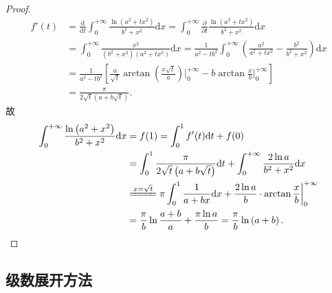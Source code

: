 \documentclass[../../main.tex]{subfiles}%
\begin{document}
\begin{proof}
\begin{align*}
f'(t)&=\frac{\mathrm{d}}{\mathrm{d}t}\int_0^{+\infty}\frac{\ln \left( a^2+tx^2 \right)}{b^2+x^2}\mathrm{d}x=\int_0^{+\infty}\frac{\partial}{\partial t}\frac{\ln \left( a^2+tx^2 \right)}{b^2+x^2}\mathrm{d}x\\
&=\int_0^{+\infty}\frac{x^2}{\left( b^2+x^2 \right) \left( a^2+tx^2 \right)}\mathrm{d}x
=\frac{1}{a^2-tb^2}\int_0^{+\infty}\left( \frac{a^2}{a^2+tx^2}-\frac{b^2}{b^2+x^2} \right) \mathrm{d}x\\
&=\frac{1}{a^2-tb^2}\left[ \frac{a}{\sqrt{t}}\arctan \left( \frac{x\sqrt{t}}{a} \right) \bigg|_{0}^{+\infty}-b\arctan \frac{x}{b}\bigg|_{0}^{+\infty} \right] \\
&=\frac{\pi}{2\sqrt{t}\left( a+b\sqrt{t} \right)}.
\end{align*}
故
\begin{align*}
\int_0^{+\infty}\frac{\ln \left( a^2+x^2 \right)}{b^2+x^2}\mathrm{d}x&=f(1)=\int_0^1f'(t)\mathrm{d}t+f(0)\\
&=\int_0^1\frac{\pi}{2\sqrt{t}\left( a+b\sqrt{t} \right)}\mathrm{d}t+\int_0^{+\infty}\frac{2\ln a}{b^2+x^2}\mathrm{d}x\\
&\xlongequal{x=\sqrt{t}}\pi \int_0^1\frac{1}{a+bx}\mathrm{d}x+\frac{2\ln a}{b}\cdot \arctan \frac{x}{b}\bigg|_{0}^{+\infty}\\
&=\frac{\pi}{b}\ln \frac{a+b}{a}+\frac{\pi \ln a}{b}=\frac{\pi}{b}\ln \left( a+b \right).
\end{align*}

\end{proof}

































\subsection{级数展开方法}
\end{document}
